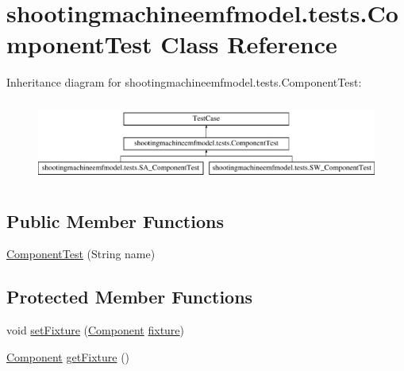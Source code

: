 \hypertarget{classshootingmachineemfmodel_1_1tests_1_1_component_test}{\section{shootingmachineemfmodel.\-tests.\-Component\-Test Class Reference}
\label{classshootingmachineemfmodel_1_1tests_1_1_component_test}
}
Inheritance diagram for shootingmachineemfmodel.\-tests.\-Component\-Test\-:\begin{figure}[H]
\begin{center}
\leavevmode
\includegraphics[height=2.692308cm]{classshootingmachineemfmodel_1_1tests_1_1_component_test}
\end{center}
\end{figure}
\subsection*{Public Member Functions}
\begin{DoxyCompactItemize}
\item 
\hyperlink{classshootingmachineemfmodel_1_1tests_1_1_component_test_ad1bc86251003337cd4c5af4419480579}{Component\-Test} (String name)
\end{DoxyCompactItemize}
\subsection*{Protected Member Functions}
\begin{DoxyCompactItemize}
\item 
void \hyperlink{classshootingmachineemfmodel_1_1tests_1_1_component_test_a82feb60599541b423af4a9b6ae468f72}{set\-Fixture} (\hyperlink{interfaceshootingmachineemfmodel_1_1_component}{Component} \hyperlink{classshootingmachineemfmodel_1_1tests_1_1_component_test_a6d7e17f0c843bc946df4aa31a0f405c6}{fixture})
\item 
\hyperlink{interfaceshootingmachineemfmodel_1_1_component}{Component} \hyperlink{classshootingmachineemfmodel_1_1tests_1_1_component_test_a267b0c586f529f310782399fac87abf5}{get\-Fixture} ()
\end{DoxyCompactItemize}

